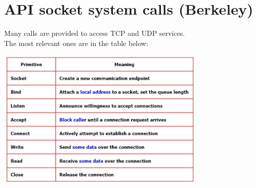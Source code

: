 \section{API socket system calls (Berkeley)}
Many calls are provided to access TCP and UDP services.
\\The most relevant ones are in the table below:
\begin{center}
    \includegraphics[width=0.75\textwidth]{img/berkeley1.jpg}
\end{center}